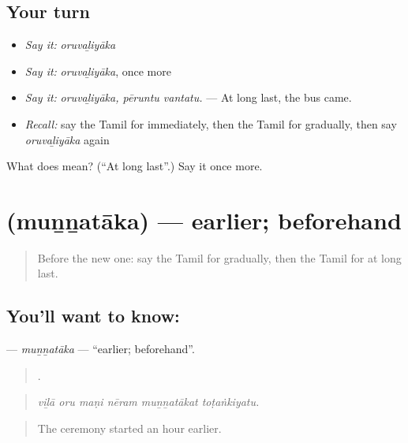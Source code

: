 \subsection*{Your turn}
\begin{itemize}
\raggedright
  \item \emph{Say it:} \emph{oruvaḻiyāka}
  \item \emph{Say it:} \emph{oruvaḻiyāka}, once more
  \item \emph{Say it:} \emph{oruvaḻiyāka, pēruntu vantatu.} — At long last, the bus came.
  \item \emph{Recall:} say the Tamil for immediately, then the Tamil for gradually, then say \emph{oruvaḻiyāka} again
\end{itemize}

\begin{tcolorbox}[breakable,colback=teal!4,colframe=teal!35!black,title={Before you move on}]
What does  mean? (\textquotedblleft{}At long last\textquotedblright{}.) Say it once more.
\end{tcolorbox}
\section[\texorpdfstring{\ta{முன்னதாக} (muṉṉatāka)}{முன்னதாக (muṉṉatāka)}]{ (muṉṉatāka) — earlier; beforehand}

\label{lesson:TA-C313-munnataka}



\begin{quote}
Before the new one: say the Tamil for gradually, then the Tamil for at long last.
\end{quote}

\subsection*{You'll want to know: }
\textbf{} — \emph{muṉṉatāka} — \textquotedblleft{}earlier; beforehand\textquotedblright{}.

\begin{quote}
     .
\end{quote}

\begin{quote}
\emph{viḻā oru maṇi nēram muṉṉatākat toṭaṅkiyatu.}
\end{quote}

\begin{quote}
The ceremony started an hour earlier.
\end{quote}

